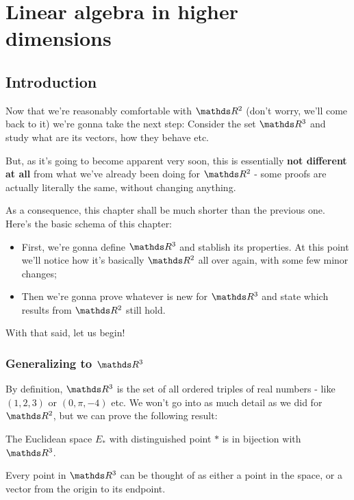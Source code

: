 \chapter{Linear algebra in higher dimensions}
\section{Introduction}

Now that we're reasonably comfortable with $\R^2$ (don't worry, we'll come back to it) we're gonna take the next step: Consider the set $\R^3$ and study what are its vectors, how they behave etc.

But, as it's going to become apparent very soon, this is essentially \textbf{not different at all} from what we've already been doing for $\R^2$ - some proofs are actually literally the same, without changing anything.

As a consequence, this chapter shall be much shorter than the previous one. Here's the basic schema of this chapter:

\begin{itemize}
	\item First, we're gonna define $\R^3$ and stablish its properties. At this point we'll notice how it's basically $\R^2$ all over again, with some few minor changes;
	\item Then we're gonna prove whatever is new for $\R^3$ and state which results from $\R^2$ still hold.
\end{itemize}

With that said, let us begin!

\newpage
\subsection{Generalizing to $\R^3$}

By definition, $\R^3$ is the set of all ordered triples of real numbers - like $(1,2,3)$ or $(0,\pi, -4)$ etc. We won't go into as much detail as we did for $\R^2$, but we can prove the following result:

\begin{prop}
	The Euclidean space $E_*$ with distinguished point $*$ is in bijection with $\R^3$.
\end{prop}
\begin{cor}
	Every point in $\R^3$ can be thought of as either a point in the space, or a vector from the origin to its endpoint.
\end{cor}

